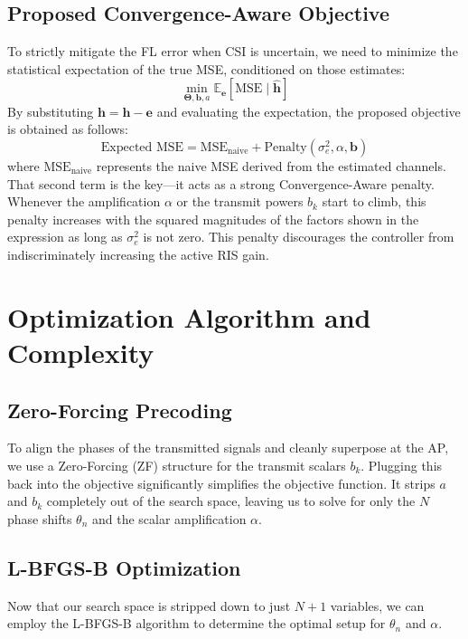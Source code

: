 \documentclass[journal, twocolumn]{IEEEtran}
\begin{document}
\subsection{Proposed Convergence-Aware Objective}
To strictly mitigate the FL error when CSI is uncertain, we need to minimize the statistical expectation of the true MSE, conditioned on those estimates:
\begin{equation}
    \min_{\mathbf{\Theta}, \mathbf{b}, a} \mathbb{E}_{\mathbf{e}} [\text{MSE} \mid \hat{\mathbf{h}}]
\end{equation}
By substituting $\mathbf{h} = \hat{\mathbf{h}} - \mathbf{e}$ and evaluating the expectation, the proposed objective is obtained as follows:
\begin{equation}
    \text{Expected MSE} = \text{MSE}_{\text{naive}} + \text{Penalty}(\sigma_e^2, \alpha, \mathbf{b})
\end{equation}
where $\text{MSE}_{\text{naive}}$ represents the naive MSE derived from the estimated channels. That second term is the key—it acts as a strong Convergence-Aware penalty. Whenever the amplification $\alpha$ or the transmit powers $b_k$ start to climb, this penalty increases with the squared magnitudes of the factors shown in the expression as long as $\sigma_e^2$ is not zero. This penalty discourages the controller from indiscriminately increasing the active RIS gain.

\section{Optimization Algorithm and Complexity}

\subsection{Zero-Forcing Precoding}
To align the phases of the transmitted signals and cleanly superpose at the AP, we use a Zero-Forcing (ZF) structure for the transmit scalars $b_k$.
Plugging this back into the objective significantly simplifies the objective function. It strips $a$ and $b_k$ completely out of the search space, leaving us to solve for only the $N$ phase shifts $\theta_n$ and the scalar amplification $\alpha$.

\subsection{L-BFGS-B Optimization}
Now that our search space is stripped down to just $N+1$ variables, we can employ the L-BFGS-B algorithm to determine the optimal setup for $\theta_n$ and $\alpha$.
\end{document}
